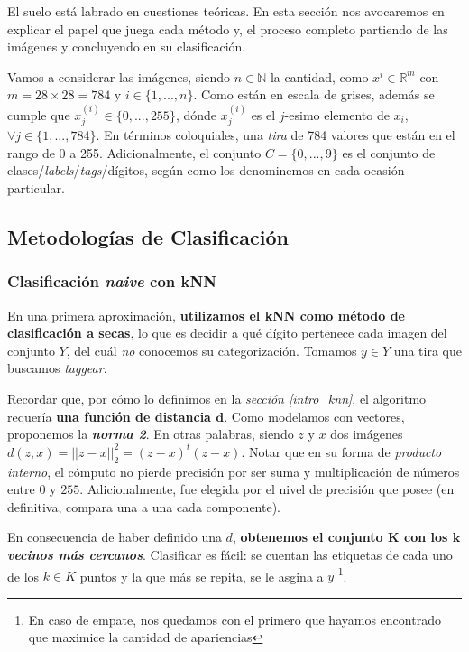 El suelo est\'a labrado en cuestiones te\'oricas. En esta secci\'on nos avocaremos en explicar el papel que juega cada m\'etodo y, el proceso completo partiendo de las im\'agenes y concluyendo en su clasificaci\'on.

Vamos a considerar las im\'agenes, siendo $n \in \mathbb{N}$ la cantidad, como $x^{i} \in \mathbb{R}^{m}$ con $m = 28 \times 28 = 784$ y $i \in \{1, ..., n\}$. Como est\'an en escala de grises, adem\'as se cumple que $x^{(i)}_{j} \in \{0, ..., 255\}$, d\'onde $x^{(i)}_{j}$ es el $j$-esimo elemento de $x_{i}$, $\forall j \in \{1, ..., 784\}$. En t\'erminos coloquiales, una \textit{tira} de 784 valores que est\'an en el rango de 0 a 255. Adicionalmente, el conjunto $C = \{0, ..., 9\}$ es el conjunto de clases/\textit{labels}/\textit{tags}/d\'igitos, seg\'un como los denominemos en cada ocasi\'on particular.

\subsection{Metodolog\'ias de Clasificaci\'on}

\subsubsection{Clasificaci\'on \textit{naive} con kNN}

En una primera aproximaci\'on, \textbf{utilizamos el kNN como m\'etodo de clasificaci\'on a secas}, lo que es decidir a qu\'e d\'igito pertenece cada imagen del conjunto $Y$, del cu\'al \textit{no} conocemos su categorizaci\'on. Tomamos $y \in Y$ una tira que buscamos \textit{taggear}.

Recordar que, por c\'omo lo definimos en la \textit{secci\'on \ref{intro_knn}}, el algoritmo requer\'ia \textbf{una funci\'on de distancia $\mathbf{d}$}. Como modelamos con vectores, proponemos la \textbf{\textit{norma 2}}. En otras palabras, siendo $z$ y $x$ dos im\'agenes $d(z,x) = \vert\vert z - x \vert\vert_2^2 = (z - x)^{t}(z - x)$. Notar que en su forma de \textit{producto interno}, el c\'omputo no pierde precisi\'on por ser suma y multiplicaci\'on de n\'umeros entre $0$ y $255$. Adicionalmente, fue elegida por el nivel de precisi\'on que posee (en definitiva, compara una a una cada componente). 

En consecuencia de haber definido una $d$, \textbf{obtenemos el conjunto $\mathbf{K}$ con los \textit{$\mathbf{k}$ vecinos m\'as cercanos}}. Clasificar es f\'acil: se cuentan las etiquetas de cada uno de los $k \in K$ puntos y la que m\'as se repita, se le asgina a $y$ \footnote{En caso de empate, nos quedamos con el primero que hayamos encontrado que maximice la cantidad de apariencias}.


